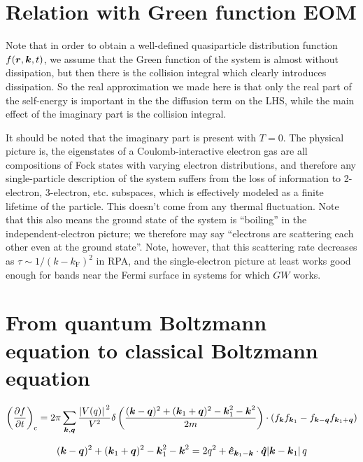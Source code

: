 \documentclass[hyperref, a4paper]{article}
\begin{document}
\section{Relation with Green function EOM}

Note that in order to obtain a well-defined 
quasiparticle distribution function $f(\vb*{r}, \vb*{k}, t)$,
we assume that the Green function of the system 
is almost without dissipation,
but then there is the collision integral
which clearly introduces dissipation. 
So the real approximation we made here is that
only the real part of the self-energy 
is important in the the diffusion term on the LHS, 
while the main effect of the imaginary part is the collision integral.

It should be noted that the imaginary part is present with $T = 0$.
The physical picture is, 
the eigenstates of a Coulomb-interactive electron gas 
are all compositions of Fock states with varying electron distributions, 
and therefore any single-particle description of the system 
suffers from the loss of information to 2-electron, 3-electron, etc. subspaces,
which is effectively modeled as a finite lifetime of the particle.
This doesn't come from any thermal fluctuation.
Note that this also means the ground state of the system is ``boiling''
in the independent-electron picture;
we therefore may say ``electrons are scattering each other even at the ground state''.
Note, however, that this scattering rate decreases as $\tau \sim 1/(k - k_{\text{F}})^2$ in RPA,
and the single-electron picture 
at least works good enough for bands near the Fermi surface 
in systems for which $GW$ works.

\section{From quantum Boltzmann equation to classical Boltzmann equation}

\begin{equation}
    \left(\pdv{f}{t}\right)_{\text{c}} = 2\pi 
    \sum_{\vb*{k}, \vb*{q}} \frac{\abs*{V(q)}^2}{V^2} 
    \delta\left(
        \frac{
            (\vb*{k} - \vb*{q})^2 + (\vb*{k}_1 + \vb*{q})^2 
            - \vb*{k}_1^2 - \vb*{k}^2
        }{2m}
    \right) \cdot (f_{\vb*{k}} f_{\vb*{k}_1} - f_{\vb*{k} - \vb*{q}} f_{\vb*{k}_1 + \vb*{q}})
\end{equation}

\[
    (\vb*{k} - \vb*{q})^2 + (\vb*{k}_1 + \vb*{q})^2 
    - \vb*{k}_1^2 - \vb*{k}^2
    = 2 q^2 + \vu*{e}_{\vb*{k}_1 - \vb*{k}} \cdot \vu*{q} \abs*{\vb*{k} - \vb*{k}_1} q
\]
\end{document}
